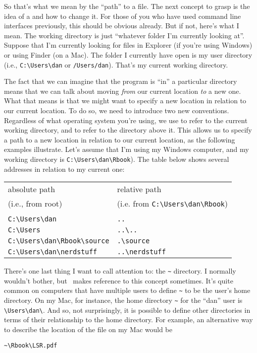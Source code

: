 So that's what we mean by the ``path'' to a file. The next concept to grasp is the idea of a  and how to change it. For those of you who have used command line interfaces previously, this should be obvious already. But if not, here's what I mean. The working directory is just ``whatever folder I'm currently looking at''. Suppose that I'm currently looking for files in Explorer (if you're using Windows) or using Finder (on a Mac). The folder I currently have open is my user directory (i.e., \verb#C:\Users\dan# or \verb#/Users/dan#). That's my current working directory. 

The fact that we can imagine that the program is ``in'' a particular directory means that we can talk about moving {\it from} our current location {\it to} a new one. What that means is that we might want to specify a new location in relation to our current location. To do so, we need to introduce two new conventions. Regardless of what operating system you're using, we use  to refer to the current working directory, and  to refer to the directory above it. This allows us to specify a path to a new location in relation to our current location, as the following examples illustrate. Let's assume that I'm using my Windows computer, and my working directory is \verb#C:\Users\dan\Rbook#). The table below shows several addresses in relation to my current one:
\begin{center}
\begin{tabular}{l|l}
absolute path  & relative path \\ 
(i.e., from root)  & (i.e. from \verb#C:\Users\dan\Rbook#) \\[4pt] \hline \\[-12pt]
\verb#C:\Users\dan# & \verb#..# \\
\verb#C:\Users# & \verb#..\..# \\
\verb#C:\Users\dan\Rbook\source# & \verb#.\source# \\
\verb#C:\Users\dan\nerdstuff# & \verb#..\nerdstuff# \\
\end{tabular}
\end{center}


There's one last thing I want to call attention to: the \verb#~# directory. I normally wouldn't bother, but \R\ makes reference to this concept sometimes. It's quite common on computers that have multiple users to define \verb#~# to be the user's home directory. On my Mac, for instance, the home directory \verb#~# for the ``dan'' user is \verb#\Users\dan\#. And so, not surprisingly, it is possible to define other directories in terms of their relationship to the home directory. For example, an alternative way to describe the location of the  file on my Mac would be 
\begin{verbatim}
~\Rbook\LSR.pdf
\end{verbatim}


